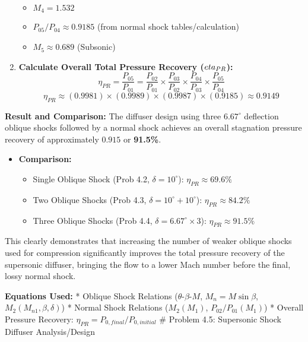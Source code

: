 \begin{enumerate}
  \begin{itemize}
  \tightlist
  \item
    \(M_4 = 1.532\)
  \item
    \(P_{05}/P_{04} \approx 0.9185\) (from normal shock
    tables/calculation)
  \item
    \(M_5 \approx 0.689\) (Subsonic)
  \end{itemize}
\item
  \textbf{Calculate Overall Total Pressure Recovery (\(\\eta_{PR}\)):}
  \[ \eta_{PR} = \frac{P_{05}}{P_{01}} = \frac{P_{02}}{P_{01}} \times \frac{P_{03}}{P_{02}} \times \frac{P_{04}}{P_{03}} \times \frac{P_{05}}{P_{04}} \]
  \[ \eta_{PR} \approx (0.9981) \times (0.9989) \times (0.9987) \times (0.9185) \approx 0.9149 \]
\end{enumerate}

\textbf{Result and Comparison:} The diffuser design using three
\(6.67^\circ\) deflection oblique shocks followed by a normal shock
achieves an overall stagnation pressure recovery of approximately
\(\mathbf{0.915}\) or \textbf{91.5\%}.

\begin{itemize}
\tightlist
\item
  \textbf{Comparison:}

  \begin{itemize}
  \tightlist
  \item
    Single Oblique Shock (Prob 4.2, \(\delta=10^\circ\)):
    \(\eta_{PR} \approx 69.6\%\)
  \item
    Two Oblique Shocks (Prob 4.3, \(\delta=10^\circ+10^\circ\)):
    \(\eta_{PR} \approx 84.2\%\)
  \item
    Three Oblique Shocks (Prob 4.4, \(\delta=6.67^\circ \times 3\)):
    \(\eta_{PR} \approx 91.5\%\)
  \end{itemize}
\end{itemize}

This clearly demonstrates that increasing the number of weaker oblique
shocks used for compression significantly improves the total pressure
recovery of the supersonic diffuser, bringing the flow to a lower Mach
number before the final, lossy normal shock.

\textbf{Equations Used:} * Oblique Shock Relations
(\(\theta\)-\(\beta\)-\(M\), \(M_n = M \sin\beta\),
\(M_2(M_{n1}, \beta, \delta)\)) * Normal Shock Relations (\(M_2(M_1)\),
\(P_{02}/P_{01}(M_1)\)) * Overall Pressure Recovery:
\(\eta_{PR} = P_{0, final}/P_{0, initial}\) \# Problem 4.5: Supersonic
Shock Diffuser Analysis/Design


